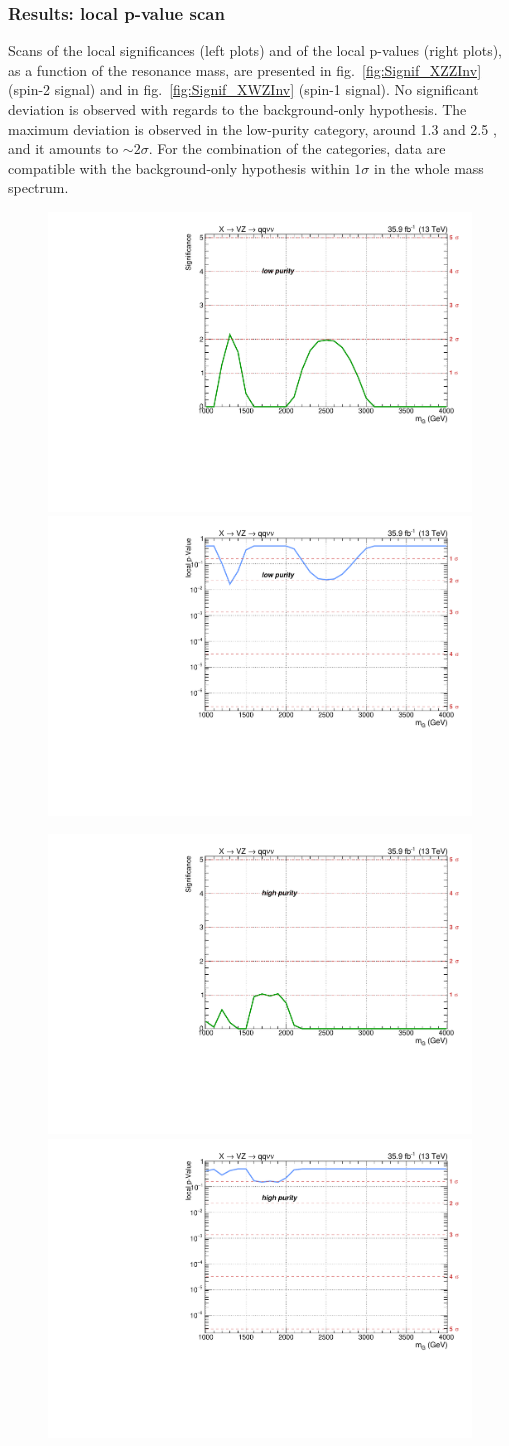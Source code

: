 \subsubsection{Results: local p-value scan}
Scans of the local significances (left plots) and of the local p-values (right plots), as a function of the resonance mass, are presented in fig.~\ref{fig:Signif_XZZInv} (spin-2 signal) and in fig.~\ref{fig:Signif_XWZInv} (spin-1 signal). No significant deviation is observed with regards to the background-only hypothesis. The maximum deviation is observed in the low-purity category, around 1.3 and 2.5 \TeV, and it amounts to $\sim 2 \sigma$. For the combination of the categories, data are compatible with the background-only hypothesis within $1 \sigma$ in the whole mass spectrum.

\begin{figure}[!htb]
  \begin{center}
     \includegraphics[width=.495\textwidth]{plotsAlpha_tesi/Limits/Significance_XZZInv_XVZnnlp.pdf}%
     \includegraphics[width=.495\textwidth]{plotsAlpha_tesi/Limits/pValue_XZZInv_XVZnnlp.pdf}

     \includegraphics[width=.495\textwidth]{plotsAlpha_tesi/Limits/Significance_XZZInv_XVZnnhp.pdf}%
     \includegraphics[width=.495\textwidth]{plotsAlpha_tesi/Limits/pValue_XZZInv_XVZnnhp.pdf}


\end{center}
\end{figure}

